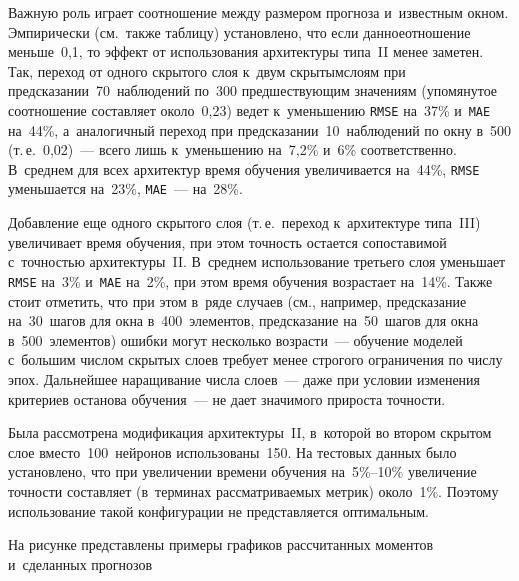 \begin{multicols}{2}
Важную роль играет соотношение между размером прогноза и~известным окном.
 Эмпирически (см.\ также таблицу) установлено, что если 
 данное\linebreak отношение меньше~0{,}1, то эффект от использования архитектуры 
 типа~{II} менее заметен. Так, пе\-реход от одного скрытого слоя 
 к~двум скрытым\linebreak слоям при предсказании~70~наблюдений по~300 пред\-шест\-ву\-ющим 
 значениям (упомянутое соотношение со\-став\-ля\-ет около~0{,}23) 
 ведет к~уменьшению \verb"RMSE" на~37\% и~\verb"MAE" на~44\%, 
 а~аналогичный переход при предсказании~10~наблюдений по окну в~500 
 (т.\,е.~0{,}02)~--- 
 всего лишь к~уменьшению на~7{,}2\% и~6\% соответственно. В~среднем 
для всех архитектур время обучения 
 увеличивается на~44\%, \verb"RMSE" уменьшается на~23\%, \verb"MAE"~--- на~28\%.

Добавление еще одного скрытого слоя (т.\,е.\ переход к~архитектуре 
типа~III) увеличивает время обучения, при этом точность 
остается сопоставимой с~точностью архитектуры~{II}. 
В~среднем использование третьего слоя уменьшает \verb"RMSE" на~3\% 
и~\verb"MAE" на~2\%, при этом время обучения возрастает на~14\%. 
Также стоит отметить, что при этом в~ряде случаев (см., например, 
предсказание на~30~шагов для окна в~400~элементов, предсказание на~50~шагов 
для окна в~500~элементов) ошибки могут несколько возрасти~--- 
обучение моделей с~большим числом скрытых слоев требует менее 
строгого ограничения по числу эпох. Дальнейшее наращивание числа слоев~--- 
даже при условии изменения критериев останова обучения~--- 
не дает значимого прироста точ\-ности.

Была рассмотрена модификация архитектуры~II, в~которой 
во втором скрытом слое вмес\-то~100~нейронов использованы~150. 
На тестовых данных было установлено, что при увеличении времени обучения 
на~5\%--10\% увеличение точности составляет 
(в~терминах рассматриваемых метрик) около~1\%. 
Поэтому использование такой конфигурации не представляется оптимальным.



На рисунке представлены примеры графиков рассчитанных моментов 
и~сделанных прогнозов\linebreak\vspace*{-12pt}

\pagebreak

\end{multicols}

